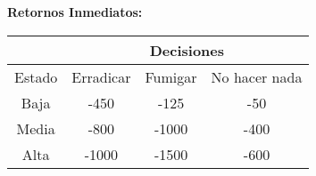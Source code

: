 \textbf{Retornos Inmediatos:}

\begin{table}[H]
\centering
\begin{tabular}{|c|c|c|c|}
\hline      

        &\multicolumn{3}{|c|}{Decisiones}\\ \hline
Estado  & Erradicar & Fumigar & No hacer nada\\ \hline
Baja   & -450 & -125 & -50            \\ \hline
Media  & -800 & -1000 & -400           \\ \hline
Alta   & -1000 & -1500 & -600           \\ \hline
\end{tabular}
\end{table}

